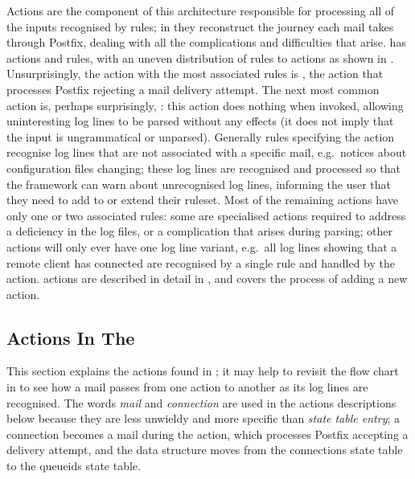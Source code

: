 Actions are the component of this architecture responsible for processing
all of the inputs recognised by rules; in \parsername{} they reconstruct
the journey each mail takes through Postfix, dealing with all the
complications and difficulties that arise.  \parsername{} has
\numberOFactions{} actions and \numberOFrules{} rules, with an uneven
distribution of rules to actions as shown in .  Unsurprisingly, the action with the most associated
rules is , the action that processes Postfix
rejecting a mail delivery attempt.  The next most common action is, perhaps
surprisingly, : this action does nothing when
invoked, allowing uninteresting log lines to be parsed without any effects
(it does not imply that the input is ungrammatical or unparsed).  Generally
rules specifying the  action recognise log lines that
are not associated with a specific mail, e.g.\ notices about configuration
files changing; these log lines are recognised and processed so that the
framework can warn about unrecognised log lines, informing the user that
they need to add to or extend their ruleset.  Most of the remaining actions
have only one or two associated rules: some are specialised actions
required to address a deficiency in the log files, or a complication that
arises during parsing; other actions will only ever have one log line
variant, e.g.\ all log lines showing that a remote client has connected are
recognised by a single rule and handled by the  action.
\parsernames{} actions are described in detail in , and  covers the process of adding a new action.


\subsection{Actions In The \parsernamelong{}}

\label{actions in detail in implementation}

This section explains the actions found in \parsername{}; it may help to
revisit the flow chart in  to see how a mail passes
from one action to another as its log lines are recognised.  The words
\textit{mail\/} and \textit{connection\/} are used in the actions
descriptions below because they are less unwieldy and more specific than
\textit{state table entry\/}; a connection becomes a mail during the
 action, which processes Postfix accepting a delivery
attempt, and the data structure moves from the connections state table to
the queueids state table.

